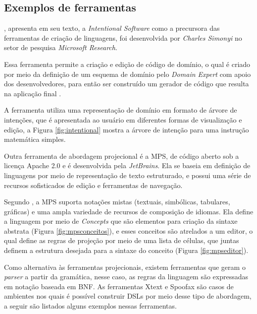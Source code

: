 \newpage
\subsection{Exemplos de ferramentas}
\label{exemplosferramentasdsl}

, apresenta em seu texto, a \textit{Intentional Software} como a precursora das ferramentas de criação de linguagens, foi desenvolvida por \textit{Charles Simonyi} no setor de pesquisa \textit{Microsoft Research}. 

Essa ferramenta permite a criação e edição de código de domínio, o qual é criado por meio da definição de um esquema de domínio pelo \textit{Domain Expert} com apoio dos desenvolvedores, para então ser construído um gerador de código que resulta na aplicação final \cite{simonyi2006intentional}. 

A ferramenta utiliza uma representação de domínio em formato de árvore de intenções, que é apresentada ao usuário em diferentes formas de visualização e edição, a Figura \ref{fig:intentional} mostra a árvore de intenção para uma instrução matemática simples.



Outra ferramenta de abordagem projecional é a \gls{MPS}, de código aberto sob a licença Apache 2.0 e é desenvolvida pela \textit{JetBrains}. Ela se baseia em definição de linguagens por meio de representação de texto estruturado, e possui uma série de recursos sofisticados de edição e ferramentas de navegação. 

Segundo , a \gls{MPS} suporta notações mistas (textuais, simbólicas, tabulares, gráficas) e uma ampla variedade de recursos de composição de idiomas. Ela define a linguagem por meio de \textit{Concepts} que são elementos para criação da sintaxe abstrata (Figura \ref{fig:mpsconceitos}), e esses conceitos são atrelados a um editor, o qual define as regras de projeção por meio de uma lista de células, que juntas definem a estrutura desejada para a sintaxe do conceito (Figura \ref{fig:mpseditor}).





\newpage


Como alternativa às ferramentas projecionais, existem ferramentas que geram o \textit{parser} a partir da gramática, nesse caso, as regras da linguagem são expressadas em notação baseada em \gls{BNF}. As ferramentas Xtext e Spoofax são casos de ambientes nos quais é possível construir \gls{DSL}s por meio desse tipo de abordagem, a seguir são listados alguns exemplos nessas ferramentas.


